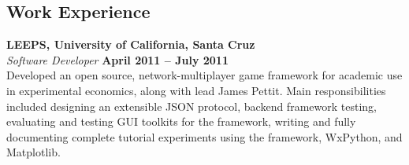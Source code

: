 \documentclass[margin,line]{resume}
\begin{document}
\begin{resume}
%
%
%
%
%

    \section{\mysidestyle Work Experience}

    \textbf{LEEPS, University of California, Santa Cruz} \vspace{2mm}\\\vspace{1mm}%
    \textsl{Software Developer} \hfill \textbf{April 2011 -- July 2011}\\
    Developed an open source, network-multiplayer game framework
    for academic use in experimental economics, along with lead
    James Pettit. Main responsibilities included designing an
    extensible JSON protocol, backend framework testing, evaluating
    and testing GUI toolkits for the framework, writing and fully
    documenting complete tutorial experiments using the framework,
    WxPython, and Matplotlib.


\end{resume}
\end{document}
